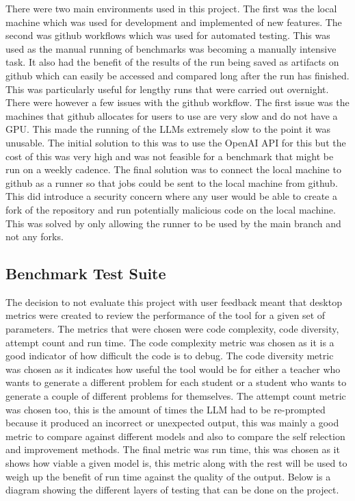\documentclass[12pt]{extarticle}
\begin{document}
There were two main environments used in this project. The first was the local machine which was used for development and implemented of new features. The second was github workflows which was used for automated testing. This was used as the manual running of benchmarks was becoming a manually intensive task. It also had the benefit of the results of the run being saved as artifacts on github which can easily be accessed and compared long after the run has finished. This was particularly useful for lengthy runs that were carried out overnight.
There were however a few issues with the github workflow. The first issue was the machines that github allocates for users to use are very slow and do not have a GPU. This made the running of the LLMs extremely slow to the point it was unusable. The initial solution to this was to use the OpenAI API for this but the cost of this was very high and was not feasible for a benchmark that might be run on a weekly cadence. The final solution was to connect the local machine to github as a runner so that jobs could be sent to the local machine from github. This did introduce a security concern where any user would be able to create a fork of the repository and run potentially malicious code on the local machine. This was solved by only allowing the runner to be used by the main branch and not any forks.

\subsection{Benchmark Test Suite}

The decision to not evaluate this project with user feedback meant that desktop metrics were created to review the performance of the tool for a given set of parameters. The metrics that were chosen were code complexity, code diversity, attempt count and run time. The code complexity metric was chosen as it is a good indicator of how difficult the code is to debug. The code diversity metric was chosen as it indicates how useful the tool would be for either a teacher who wants to generate a different problem for each student or a student who wants to generate a couple of different problems for themselves. The attempt count metric was chosen too, this is the amount of times the LLM had to be re-prompted because it produced an incorrect or unexpected output, this was mainly a good metric to compare against different models and also to compare the self relection and improvement methods. The final metric was run time, this was chosen as it shows how viable a given model is, this metric along with the rest will be used to weigh up the benefit of run time against the quality of the output. Below is a diagram showing the different layers of testing that can be done on the project.
\end{document}
